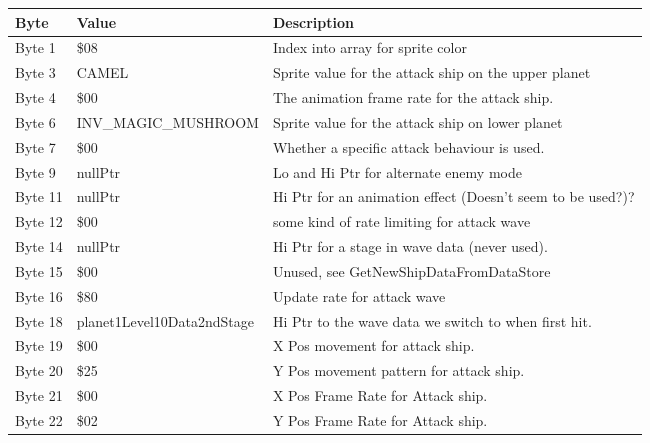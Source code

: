 \begin{figure}[H]
{\begin{adjustbox}{width=12cm}
\begin{tabular}{lll}
\toprule
 Byte    & Value                      & Description                                                        \\
\midrule
 Byte 1  & \$08                        & Index into array for sprite color                                  \\
 Byte 3  & CAMEL                      & Sprite value for the attack ship on the upper planet               \\
 Byte 4  & \$00                        & The animation frame rate for the attack ship.                      \\
 Byte 6  & INV\_MAGIC\_MUSHROOM         & Sprite value for the attack ship on lower planet                   \\
 Byte 7  & \$00                        & Whether a specific attack behaviour is used.                       \\
 Byte 9  & nullPtr                    & Lo and Hi Ptr for alternate enemy mode                             \\
 Byte 11 & nullPtr                    & Hi Ptr for an animation effect (Doesn't seem to be used?)?         \\
 Byte 12 & \$00                        & some kind of rate limiting for attack wave                         \\
 Byte 14 & nullPtr                    & Hi Ptr for a stage in wave data (never used).                      \\
 Byte 15 & \$00                        & Unused, see GetNewShipDataFromDataStore                            \\
 Byte 16 & \$80                        & Update rate for attack wave                                        \\
 Byte 18 & planet1Level10Data2ndStage & Hi Ptr to the wave data we switch to when first hit.               \\
 Byte 19 & \$00                        & X Pos movement for attack ship.                                    \\
 Byte 20 & \$25                        & Y Pos movement pattern for attack ship.                            \\
 Byte 21 & \$00                        & X Pos Frame Rate for Attack ship.                                  \\
 Byte 22 & \$02                        & Y Pos Frame Rate for Attack ship.                                  \\

\end{tabular}
\end{adjustbox}}
\end{figure}
